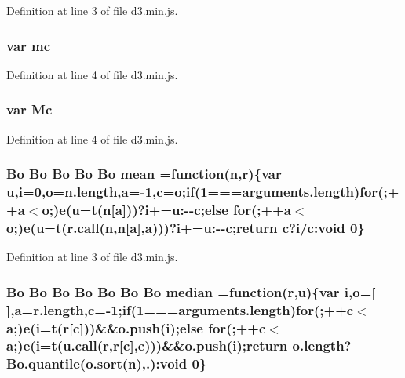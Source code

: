 Definition at line 3 of file d3.\+min.\+js.

\subsubsection[{mc}]{\setlength{\rightskip}{0pt plus 5cm}var mc}\label{d3_8min_8js_a968d5db880e3a7f270a6eb39f96dd8c0}


Definition at line 4 of file d3.\+min.\+js.

\subsubsection[{Mc}]{\setlength{\rightskip}{0pt plus 5cm}var Mc}\label{d3_8min_8js_abd0d35b66c15f7275f2e35a6d799a496}


Definition at line 4 of file d3.\+min.\+js.

\subsubsection[{mean}]{ {\bf Bo} {\bf Bo} {\bf Bo} {\bf Bo} {\bf Bo} mean =function({\bf n},{\bf r})\{var u,{\bf i}=0,{\bf o}=n.\+length,{\bf a}=-\/1,{\bf c}={\bf o};{\bf if}(1===arguments.\+length){\bf for}(;++{\bf a}$<${\bf o};){\bf e}(u=t({\bf n}[{\bf a}]))?{\bf i}+=u\+:-\/-\/{\bf c};{\bf else} {\bf for}(;++{\bf a}$<${\bf o};){\bf e}(u=t({\bf r.\+call}({\bf n},{\bf n}[{\bf a}],{\bf a})))?{\bf i}+=u\+:-\/-\/{\bf c};{\bf return} {\bf c}?{\bf i}/c\+:void 0\}}\label{d3_8min_8js_a59d0e65c29673e99b04c46928db79497}


Definition at line 3 of file d3.\+min.\+js.

\subsubsection[{median}]{ {\bf Bo} {\bf Bo} {\bf Bo} {\bf Bo} {\bf Bo} {\bf Bo} {\bf Bo} median =function({\bf r},u)\{var {\bf i},{\bf o}=[$\,$],{\bf a}=r.\+length,{\bf c}=-\/1;{\bf if}(1===arguments.\+length){\bf for}(;++{\bf c}$<${\bf a};){\bf e}({\bf i}=t({\bf r}[{\bf c}]))\&\&o.\+push({\bf i});{\bf else} {\bf for}(;++{\bf c}$<${\bf a};){\bf e}({\bf i}=t({\bf u.\+call}({\bf r},{\bf r}[{\bf c}],{\bf c})))\&\&o.\+push({\bf i});{\bf return} o.\+length?{\bf Bo.\+quantile}({\bf o.\+sort}({\bf n}),.)\+:void 0\}}\label{d3_8min_8js_a0dc54463295d08993411648d1492846a}


